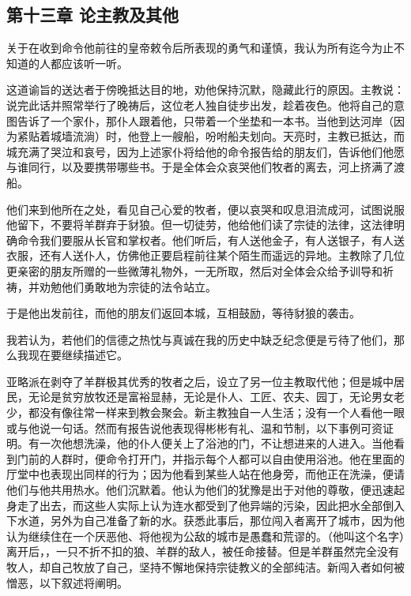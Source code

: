 
\subsection{第十三章 论主教及其他}

关于在收到命令他前往的皇帝敕令后所表现的勇气和谨慎，我认为所有迄今为止不知道的人都应该听一听。\par

这道谕旨的送达者于傍晚抵达目的地，劝他保持沉默，隐藏此行的原因。主教说：说完此话并照常举行了晚祷后，这位老人独自徒步出发，趁着夜色。他将自己的意图告诉了一个家仆，那仆人跟着他，只带着一个坐垫和一本书。当他到达河岸（因为紧贴着城墙流淌）时，他登上一艘船，吩咐船夫划向。天亮时，主教已抵达，而城充满了哭泣和哀号，因为上述家仆将给他的命令报告给的朋友们，告诉他们他愿与谁同行，以及要携带哪些书。于是全体会众哀哭他们牧者的离去，河上挤满了渡船。\par

他们来到他所在之处，看见自己心爱的牧者，便以哀哭和叹息泪流成河，试图说服他留下，不要将羊群弃于豺狼。但一切徒劳，他给他们读了宗徒的法律，这法律明确命令我们要服从长官和掌权者。他们听后，有人送他金子，有人送银子，有人送衣服，还有人送仆人，仿佛他正要启程前往某个陌生而遥远的异地。主教除了几位更亲密的朋友所赠的一些微薄礼物外，一无所取，然后对全体会众给予训导和祈祷，并劝勉他们勇敢地为宗徒的法令站立。\par

于是他出发前往，而他的朋友们返回本城，互相鼓励，等待豺狼的袭击。\par

我若认为，若他们的信德之热忱与真诚在我的历史中缺乏纪念便是亏待了他们，那么我现在要继续描述它。\par

亚略派在剥夺了羊群极其优秀的牧者之后，设立了另一位主教取代他；但是城中居民，无论是贫穷放牧还是富裕显赫，无论是仆人、工匠、农夫、园丁，无论男女老少，都没有像往常一样来到教会聚会。新主教独自一人生活；没有一个人看他一眼或与他说一句话。然而有报告说他表现得彬彬有礼、温和节制，以下事例可资证明。有一次他想洗澡，他的仆人便关上了浴池的门，不让想进来的人进入。当他看到门前的人群时，便命令打开门，并指示每个人都可以自由使用浴池。他在里面的厅堂中也表现出同样的行为；因为他看到某些人站在他身旁，而他正在洗澡，便请他们与他共用热水。他们沉默着。他认为他们的犹豫是出于对他的尊敬，便迅速起身走了出去，而这些人实际上认为连水都受到了他异端的污染，因此把水全部倒入下水道，另外为自己准备了新的水。获悉此事后，那位闯入者离开了城市，因为他认为继续住在一个厌恶他、将他视为公敌的城市是愚蠢和荒谬的。（他叫这个名字）离开后，，一只不折不扣的狼、羊群的敌人，被任命接替。但是羊群虽然完全没有牧人，却自己牧放了自己，坚持不懈地保持宗徒教义的全部纯洁。新闯入者如何被憎恶，以下叙述将阐明。\par

